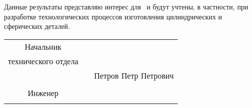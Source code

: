 Данные результаты представляю интерес для \leadingOrganizationTitle\ и будут учтены, в частности, при разработке технологических процессов изготовления цилиндрических и сферических деталей.
\vspace{0.5cm}
 
 

\begin{center}
	\begin{tabular}[c]{c m{4cm} l}
		
		       Начальник         &            &                                      \\
		  технического отдела    &            &                                      \\
		          \ktn           & \hrulefill & Петров Петр Петрович                 \\
		                         &            &                                      \\
		        Инженер          &            &                                      \\
		\thesisOrganizationShort & \hrulefill & \thesisAuthor
	\end{tabular}
\end{center}

\clearpage
 
